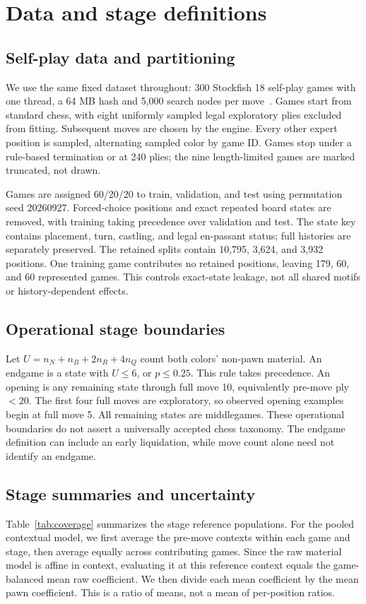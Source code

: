 \documentclass{jcst}
\begin{document}
\section{Data and stage definitions}
\subsection{Self-play data and partitioning}
We use the same fixed dataset throughout: 300 Stockfish 18 self-play games with one thread, a 64 MB hash and 5,000 search nodes per move\ \cite{stockfish}. Games start from standard chess, with eight uniformly sampled legal exploratory plies excluded from fitting. Subsequent moves are chosen by the engine. Every other expert position is sampled, alternating sampled color by game ID. Games stop under a rule-based termination or at 240 plies; the nine length-limited games are marked truncated, not drawn.

Games are assigned 60/20/20 to train, validation, and test using permutation seed 20260927. Forced-choice positions and exact repeated board states are removed, with training taking precedence over validation and test. The state key contains placement, turn, castling, and legal en-passant status; full histories are separately preserved. The retained splits contain 10,795, 3,624, and 3,932 positions. One training game contributes no retained positions, leaving 179, 60, and 60 represented games. This controls exact-state leakage, not all shared motifs or history-dependent effects.

\subsection{Operational stage boundaries}
Let $U=n_N+n_B+2n_R+4n_Q$ count both colors' non-pawn material. An endgame is a state with $U\leq6$, or $p\leq0.25$. This rule takes precedence. An opening is any remaining state through full move 10, equivalently pre-move ply $<20$. The first four full moves are exploratory, so observed opening examples begin at full move 5. All remaining states are middlegames. These operational boundaries do not assert a universally accepted chess taxonomy. The endgame definition can include an early liquidation, while move count alone need not identify an endgame.

\subsection{Stage summaries and uncertainty}
Table~\ref{tab:coverage} summarizes the stage reference populations. For the pooled contextual model, we first average the pre-move contexts within each game and stage, then average equally across contributing games. Since the raw material model is affine in context, evaluating it at this reference context equals the game-balanced mean raw coefficient. We then divide each mean coefficient by the mean pawn coefficient. This is a ratio of means, not a mean of per-position ratios.
\end{document}
